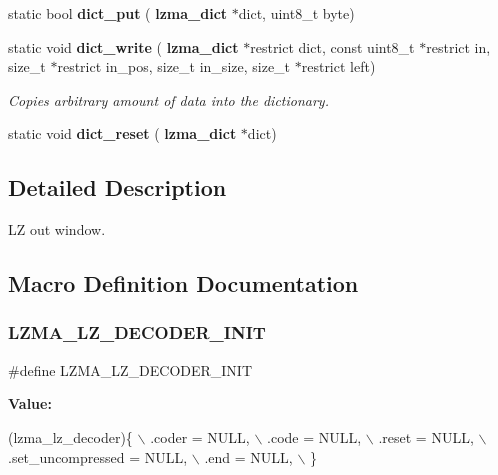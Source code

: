 \begin{DoxyCompactItemize}
static bool \textbf{ dict\+\_\+put} (\textbf{ lzma\+\_\+dict} $\ast$dict, uint8\+\_\+t byte)
\item 
static void \textbf{ dict\+\_\+write} (\textbf{ lzma\+\_\+dict} $\ast$restrict dict, const uint8\+\_\+t $\ast$restrict in, size\+\_\+t $\ast$restrict in\+\_\+pos, size\+\_\+t in\+\_\+size, size\+\_\+t $\ast$restrict left)
\begin{DoxyCompactList}\small\item\em Copies arbitrary amount of data into the dictionary. \end{DoxyCompactList}\item 
\mbox{\label{lz__decoder_8h_a729d355916eccfbfd4d97713948dafa5}} 
static void {\bfseries dict\+\_\+reset} (\textbf{ lzma\+\_\+dict} $\ast$dict)
\end{DoxyCompactItemize}


\subsection{Detailed Description}
LZ out window. 



\subsection{Macro Definition Documentation}
\mbox{\label{lz__decoder_8h_af5478bc5429f666f9c45cd413ffcb146}} 
\subsubsection{L\+Z\+M\+A\+\_\+\+L\+Z\+\_\+\+D\+E\+C\+O\+D\+E\+R\+\_\+\+I\+N\+IT}
{\footnotesize\ttfamily \#define L\+Z\+M\+A\+\_\+\+L\+Z\+\_\+\+D\+E\+C\+O\+D\+E\+R\+\_\+\+I\+N\+IT}

{\bfseries Value\+:}
\begin{DoxyCode}
(lzma_lz_decoder)\{ \(\backslash\)
                .coder = NULL, \(\backslash\)
                .code = NULL, \(\backslash\)
                .reset = NULL, \(\backslash\)
                .set\_uncompressed = NULL, \(\backslash\)
                .end = NULL, \(\backslash\)
        \}
\end{DoxyCode}


